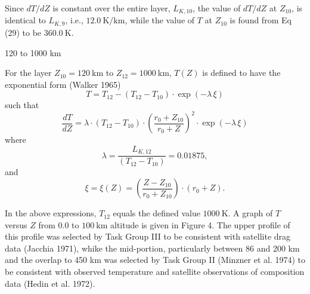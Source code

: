 \documentclass{article}
\begin{document}
Since \(dT/dZ\) is constant over the entire layer, \(L_{K,10}\), the value of \(dT/dZ\) at \(Z_{10}\), is identical to \(L_{K,9}\), i.e., \(12.0~\text{K/km}\), while the value of \(T\) at \(Z_{10}\) is found from Eq (29) to be \(360.0~\text{K}\).

120 to 1000 km

For the layer \(Z_{10} = 120~\text{km}\) to \(Z_{12} = 1000~\text{km}\), \(T(Z)\) is defined to have the exponential form (Walker 1965)
\[
T = T_{12} - (T_{12} - T_{10}) \cdot \exp(-\lambda \, \xi) \tag{31}
\]
such that
\[
\frac{dT}{dZ} = \lambda \cdot (T_{12} - T_{10}) \cdot \left(\frac{r_0 + Z_{10}}{r_0 + Z}\right)^2 \cdot \exp(-\lambda \, \xi) \tag{32}
\]
where
\[
\lambda = \frac{L_{K,12}}{(T_{12} - T_{10})} = 0.01875,
\]
and
\[
\xi = \xi(Z) = \left(\frac{Z - Z_{10}}{r_0 + Z_{10}}\right) \cdot (r_0 + Z).
\]

In the above expressions, \(T_{12}\) equals the defined value \(1000~\text{K}\). A graph of \(T\) versus \(Z\) from \(0.0\) to \(100~\text{km}\) altitude is given in Figure 4. The upper profile of this profile was selected by Task Group III to be consistent with satellite drag data (Jacchia 1971), whike the mid-portion, particularly between 86 and 200 km and the overlap to 450 km was selected by Task Group II (Minzner et al. 1974) to be consistent with observed temperature and satellite observations of composition data (Hedin et al. 1972).
\end{document}
